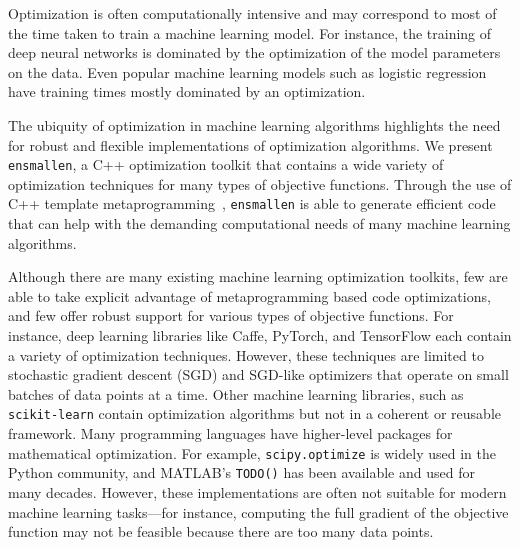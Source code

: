 \documentclass{article}
\begin{document}
Optimization is often computationally intensive and may correspond
to most of the time taken to train a machine learning model.  For instance, the
training of deep neural networks is dominated by the optimization of the model
parameters on the data. %
Even popular machine learning models such as logistic regression %
have training times mostly dominated by an optimization.
%

The ubiquity of optimization in machine learning algorithms highlights the need
for robust and flexible implementations of optimization algorithms.
We present {\tt ensmallen}, a C++ optimization toolkit
that contains a wide variety of optimization techniques for many types of
objective functions.  Through the use of C++ template metaprogramming~\cite{TODO},
{\tt ensmallen} is able to generate efficient code that can help with the
demanding computational needs of many machine learning algorithms.

Although there are many existing machine learning optimization toolkits, few
are able to take explicit advantage of metaprogramming based code optimizations,
and few offer robust support for various types of objective functions.
For instance, deep learning
libraries like Caffe, %
PyTorch, %
and TensorFlow %
each contain a variety of optimization techniques.  However, these techniques are
limited to stochastic gradient descent (SGD) and SGD-like optimizers that
operate on small batches of data points at a time.  Other machine learning
libraries, such as {\tt scikit-learn} %
contain optimization algorithms but not in a coherent or reusable framework.
Many programming languages have higher-level packages for
mathematical optimization.  For example, {\tt scipy.optimize} %
is widely used in the Python community, and MATLAB's {\tt TODO()}
has been available and used for many decades.  However, these implementations
are often not suitable for modern machine learning tasks---for instance,
computing the full gradient of the objective function may not be feasible
because there are too many data points.
\end{document}
